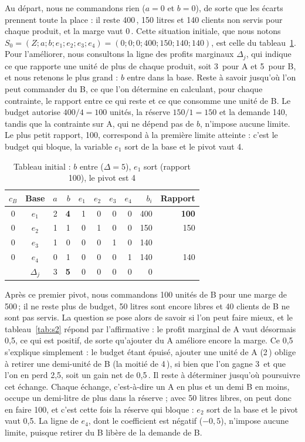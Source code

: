 \documentclass[11pt,a4paper]{article}
\newcommand{\eur}{\,\text{€}}
\begin{document}
Au départ, nous ne commandons rien ($a = 0$ et $b = 0$), de sorte que les écarts prennent
toute la place : il reste 400\eur, 150 litres et 140 clients non servis pour chaque produit,
et la marge vaut 0\eur. Cette situation initiale, que nous notons
$S_0 = (Z ; a ; b ; e_1 ; e_2 ; e_3 ; e_4) = (0 ; 0 ; 0 ; 400 ; 150 ; 140 ; 140)$, est celle du
tableau~\ref{tab:s1}. Pour l'améliorer, nous consultons la ligne des profits marginaux
$\Delta_j$, qui indique ce que rapporte une unité de plus de chaque produit, soit 3\eur{} pour
A et 5\eur{} pour B, et nous retenons le plus grand : $b$ entre dans la base. Reste à savoir
jusqu'où l'on peut commander du B, ce que l'on détermine en calculant, pour chaque contrainte,
le rapport entre ce qui reste et ce que consomme une unité de B. Le budget autorise
$400 / 4 = 100$ unités, la réserve $150 / 1 = 150$ et la demande 140, tandis que la contrainte
sur A, qui ne dépend pas de $b$, n'impose aucune limite. Le plus petit rapport, 100,
correspond à la première limite atteinte : c'est le budget qui bloque, la variable $e_1$ sort
de la base et le pivot vaut 4.

\begin{table}[!htbp]
\centering\footnotesize
\caption{Tableau initial : $b$ entre ($\Delta = 5$), $e_1$ sort (rapport 100), le pivot est 4}\label{tab:s1}
\begin{tabular}{@{}cc|rrrrrr|r|r@{}}
\toprule
$c_B$ & Base & $a$ & $b$ & $e_1$ & $e_2$ & $e_3$ & $e_4$ & $b_i$ & Rapport \\
\midrule
0 & $e_1$ & 2 & \textbf{4} & 1 & 0 & 0 & 0 & 400 & \textbf{100} \\
0 & $e_2$ & 1 & 1 & 0 & 1 & 0 & 0 & 150 & 150 \\
0 & $e_3$ & 1 & 0 & 0 & 0 & 1 & 0 & 140 & \\
0 & $e_4$ & 0 & 1 & 0 & 0 & 0 & 1 & 140 & 140 \\
\midrule
 & $\Delta_j$ & 3 & \textbf{5} & 0 & 0 & 0 & 0 & 0 & \\
\bottomrule
\end{tabular}
\end{table}

Après ce premier pivot, nous commandons 100 unités de B pour une marge de 500\eur ; il ne
reste plus de budget, 50 litres sont encore libres et 40 clients de B ne sont pas servis. La
question se pose alors de savoir si l'on peut faire mieux, et le tableau~\ref{tab:s2} répond
par l'affirmative : le profit marginal de A vaut désormais 0,5, ce qui est positif, de sorte
qu'ajouter du A améliore encore la marge. Ce 0,5 s'explique simplement : le budget étant
épuisé, ajouter une unité de A (2\eur) oblige à retirer une demi-unité de B (la moitié de
4\eur), si bien que l'on gagne 3\eur{} et que l'on en perd 2,5, soit un gain net de 0,5\eur.
Il reste à déterminer jusqu'où poursuivre cet échange. Chaque échange, c'est-à-dire un A en
plus et un demi B en moins, occupe un demi-litre de plus dans la réserve ; avec 50 litres
libres, on peut donc en faire 100, et c'est cette fois la réserve qui bloque : $e_2$ sort de
la base et le pivot vaut 0,5. La ligne de $e_4$, dont le coefficient est négatif ($-0{,}5$),
n'impose aucune limite, puisque retirer du B libère de la demande de B.
\end{document}
